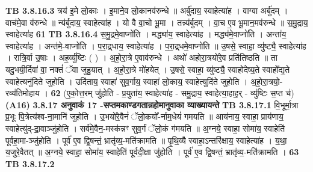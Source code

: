 \documentclass[17pt]{extarticle}
\begin{document}
{{{{{{{{{{{{{{{{{{{{{{                  \newline
                                \textbf{ TB 3.8.16.3} \newline
                  त्रय॑ इ॒मे लो॒काः । इ॒माने॒व लो॒कानव॑रुन्धे ॥ अर्बु॑दाय॒ स्वाहेत्या॑ह । वाग्वा अर्बु॑दम् । वाच॑मे॒वा व॑रुन्धे ॥ न्य॑र्बुदाय॒ स्वाहेत्या॑ह । यो वै वा॒चो भू॒मा । तन्न्य॑र्बुदम् । वा॒च ए॒व भू॒मान॒मव॑रुन्धे ॥ स॒मु॒द्राय॒ स्वाहेत्या॑ह \textbf{ 61} \newline
                  \newline
                                \textbf{ TB 3.8.16.4} \newline
                  स॒मु॒द्रमे॒वाप्नो॑ति । मद्ध्या॑य॒ स्वाहेत्या॑ह । मद्ध्य॑मे॒वाप्नो॑ति । अन्ता॑य॒ स्वाहेत्या॑ह । अन्त॑मे॒-वाप्नो॑ति । प॒रा॒द्र्धाय॒ स्वाहेत्या॑ह । प॒रा॒द्र्धमे॒वाप्नो॑ति ॥ उ॒षसे॒ स्वाहा॒ व्यु॑ष्ट्यै॒ स्वाहेत्या॑ह । रात्रि॒र्वा उ॒षाः । अह॒र्व्यु॑ष्टिः ( ) । अ॒हो॒रा॒त्रे ए॒वाव॑रुन्धे । अथो॑ अहोरा॒त्रयो॑रे॒व प्रति॑तिष्ठति ॥ ता यदु॒भयी॒र्दिवा॑ वा॒ नक्तं॑ ॅवा जुहु॒यात् । अ॒हो॒रा॒त्रे मो॑हयेत् । उ॒षसे॒ स्वाहा॒ व्यु॑ष्ट्यै॒ स्वाहो॑देष्य॒ते स्वाहो᳚द्य॒ते स्वाहेत्यनु॑दिते जुहोति । उदि॑ताय॒ स्वाहा॑ सुव॒र्गाय॒ स्वाहा॑ लो॒काय॒ स्वाहेत्युदि॑ते जुहोति । अ॒हो॒रा॒त्रयो॒-रव्य॑तिमोहाय । \textbf{ 62} \newline
                  \newline
                                    (ए॒को॒त्त॒रम् जु॑होति - प्र॒युता॑य॒ स्वाहेत्या॑ह - समु॒द्राय॒ स्वाहेत्या॒हाह॒र् - व्यु॑ष्टिः स॒प्त च॑) \textbf{(A16)} \newline \newline
                \textbf{ 3.8.17    अनुवाकं   17 -सप्तमकाण्डगतान्नहोमानुवाका व्याख्यायन्ते} \newline
                                \textbf{ TB 3.8.17.1} \newline
                  वि॒भूर्मा॒त्रा प्र॒भूः पि॒त्रेत्य॑श्व-ना॒मानि॑ जुहोति । उ॒भयो॑रे॒वैनं॑ ॅलो॒कयो᳚-र्नाम॒धेयं॑ गमयति ॥ आय॑नाय॒ स्वाहा॒ प्राय॑णाय॒ स्वाहेत्यु॑द्-द्रा॒वाञ्जु॑होति । सर्व॑मे॒वैन॒-मस्क॑न्नꣳ सुव॒र्गं ॅलो॒कं ग॑मयति ॥ अ॒ग्नये॒ स्वाहा॒ सोमा॑य॒ स्वाहेति॑ पूर्वहा॒मा-ञ्जु॑होति । पूर्व॑ ए॒व द्वि॒षन्तं॒ भ्रातृ॑व्य॒-मति॑क्रामति ॥ पृ॒थि॒व्यै स्वाहा॒ऽन्तरि॑क्षाय॒ स्वाहेत्या॑ह । य॒था॒ य॒जुरे॒वैतत् ॥ अ॒ग्नये॒ स्वाहा॒ सोमा॑य॒ स्वाहेति॑ पूर्वदी॒क्षा जु॑होति । पूर्व॑ ए॒व द्वि॒षन्तं॒ भ्रातृ॑व्य॒-मति॑क्रामति । \textbf{ 63} \newline
                  \newline
                                \textbf{ TB 3.8.17.2} \newline
}}}}}}}}}}}}}}}}}}}}}}
\end{document}
